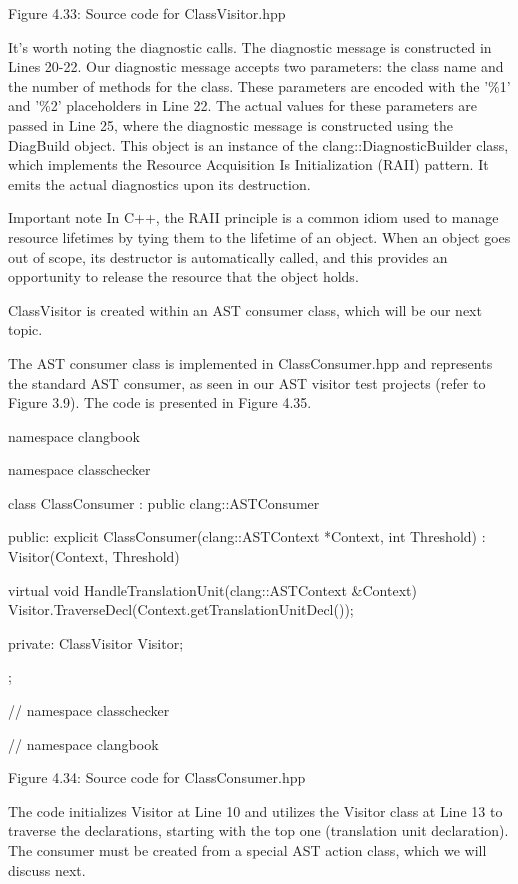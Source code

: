 \begin{center}
Figure 4.33: Source code for ClassVisitor.hpp
\end{center}

It's worth noting the diagnostic calls. The diagnostic message is constructed in Lines 20-22. Our diagnostic message accepts two parameters: the class name and the number of methods for the class. These parameters are encoded with the '\%1' and '\%2' placeholders in Line 22. The actual values for these parameters are passed in Line 25, where the diagnostic message is constructed using the DiagBuild object. This object is an instance of the clang::DiagnosticBuilder class, which implements the Resource Acquisition Is Initialization (RAII) pattern. It emits the actual diagnostics upon its destruction.

\begin{myNotic}{Important note}
In C++, the RAII principle is a common idiom used to manage resource lifetimes by tying them to the lifetime of an object. When an object goes out of scope, its destructor is automatically called, and this provides an opportunity to release the resource that the object holds.
\end{myNotic}

ClassVisitor is created within an AST consumer class, which will be our next topic.


The AST consumer class is implemented in ClassConsumer.hpp and represents the standard AST consumer, as seen in our AST visitor test projects (refer to Figure 3.9). The code is presented in Figure 4.35.

\begin{cpp}
namespace clangbook {
namespace classchecker {
class ClassConsumer : public clang::ASTConsumer {
public:
  explicit ClassConsumer(clang::ASTContext *Context, int Threshold)
    : Visitor(Context, Threshold) {}

  virtual void HandleTranslationUnit(clang::ASTContext &Context) {
    Visitor.TraverseDecl(Context.getTranslationUnitDecl());
  }

private:
  ClassVisitor Visitor;
};
} // namespace classchecker
} // namespace clangbook
\end{cpp}

\begin{center}
Figure 4.34: Source code for ClassConsumer.hpp
\end{center}

The code initializes Visitor at Line 10 and utilizes the Visitor class at Line 13 to traverse the declarations, starting with the top one (translation unit declaration). The consumer must be created from a special AST action class, which we will discuss next.

